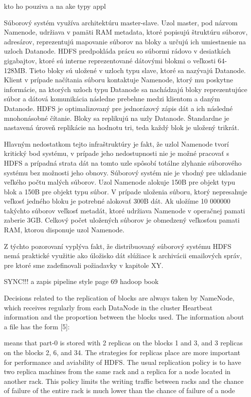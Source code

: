 \documentclass[11pt,twoside,a4paper]{book}
\begin{document}
kto ho pouziva a na ake typy appl


Súborový systém využíva architektúru master-slave. Uzol master, pod názvom Namenode, udržiava v pamäti RAM metadata, ktoré popisujú štruktúru súborov, adresárov, reprezentujú mapovanie súborov na bloky a určujú ich umiestnenie na uzloch Datanode. HDFS predpokláda prácu so súbormi rádovo v desiatkách gigabajtov, ktoré sú interne reprezentované dátovými blokmi o veľkosti  64-128MB. Tieto bloky sú uložené v uzloch typu slave, ktoré sa nazývajú Datanode. Klient v prípade načítania súboru kontaktuje Namenode, ktorý mu poskytne informácie, na ktorých uzloch typu Datanode sa nachádzajú bloky reprezentujúce súbor a dátová komunikácia následne prebehne medzi klientom a daným Datanode. HDFS je optimalizovaný pre jednorázový zápis dát a ich následné mnohonásobné čítanie. Bloky sa replikujú na uzly Datanode. Štandardne je nastavená úroveň replikácie na hodnotu tri, teda každý blok je uložený trikrát.


Hlavným nedostatkom tejto infraštruktúry je fakt, že uzlol Namenode tvorí kritický bod systému, v prípade jeho nedostupnosti nie je možné pracovať s HDFS a prípadná strata dát na tomto uzle spôsobí totálne zlyhanie súborového systému bez možnosti jeho obnovy. Súborový systém nie je vhodný pre ukladanie veľkého počtu malých súborov.
Uzol Namenode alokuje 150B pre objekt typu blok a 150B pre objekt typu súbor. V prípade uloženia súboru, ktorý nepresahuje veľkosť jedného bloku je potrebné alokovať 300B dát. Ak uložíme 10 000000 takýchto súborov veľkosť metadát, ktoré udržiava Namenode v operačnej pamati zaberie 3GB. Celkový počet uložených súborov je obmedzený veľkosťou pamati RAM, ktorou disponuje uzol Namenode.

Z týchto pozorovaní vyplýva fakt, že distribuovaný súborový systému HDFS nemá praktické využitie ako úložisko dát slúžiace k archivácii emailových správ, pre ktoré sme zadefinovali požiadavky v kapitole XY.

SYNC!!! a zapis pipeline style
 page 69 hadoop book

Decisions related to the replication of blocks are always taken
by NameNode, which receives regularly from each DataNode
in the cluster Heartbeat information and the proportion
between the blocks used. The information about a file has the
form [5]:

means that part-0 is stored with 2 replicas on the blocks 1 and 3, and 3 replicas on the blocks 2, 6, and 34. The strategies
for replicas place are more important for performance and aviability of HDFS. The usual replication policy is to have two replica machines from the same rack and a replica for a node located in another rack. This policy limits the writing traffic between racks and the chance of failure of the entire rack is much lower than the chance of failure of a node
\end{document}
